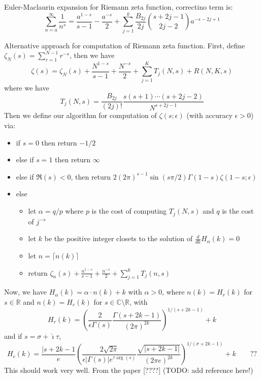 \documentclass[10pt,dvipdfmx,letterpaper,twoside]{article}
\newcommand{\RR}{{\mathbb{R}}}
\newcommand{\CC}{{\mathbb{C}}}
\newcommand{\ii}{{\hat{\imath}}}
\let\al=\alpha
\let\Gam=\Gamma
\begin{document}
Euler-Maclaurin expansion for Riemann zeta function, correctino term is:
\[ \sum_{n=a}^\infty \frac{1}{n^s} = \frac{a^{1-s}}{s-1} - \frac{a^{-s}}{2} + \sum_{j=1}^k \frac{B_{2j}}{2j}\binom{s+2j-1}{2j-2} a^{-s-2j+1} \]

Alternative approach for computation of Riemann zeta function.
First, define $\zeta_N(s) = \sum_{r=1}^{N-1} r^{-s}$, then we have
\[ \zeta(s) = \zeta_N(s) + \frac{N^{1-s}}{s-1} + \frac{N^{-s}}{2} + \sum_{j=1}^K T_j(N,s) + R(N,K,s) \]
where we have
\[ T_j(N,s) = \frac{B_{2j}}{(2j)!} \frac{s(s+1)\cdots(s+2j-2)}{N^{s+2j-1}} \]
Then we define our algorithm for computation of $\zeta(s;\epsilon)$ (with accuracy $\epsilon>0$) via:
\begin{itemize}
  \item if $s=0$ then return $-1/2$
  \item else if $s=1$ then return $\infty$
  \item else if $\Re(s)<0$, then return $2(2\pi)^{s-1} \sin(s\pi/2) \Gamma(1-s) \zeta(1-s;\epsilon)$
  \item else
  \begin{itemize}
    \item let $\al=q/p$ where $p$ is the cost of computing $T_j(N,s)$ and $q$ is the cost of $j^{-s}$
    \item let $k$ be the positive integer closets to the solution of $\frac{d}{dk} H_\al(k)=0$
    \item let $n=\lceil n(k) \rceil$
    \item return $\zeta_n(s) + \frac{n^{1-s}}{s-1} + \frac{n^{-s}}{2} + \sum_{j=1}^k T_j(n,s)$
  \end{itemize}
\end{itemize}
Now, we have $H_\al(k) = \al\cdot n(k) + k$ with $\al>0$, where $n(k)=H_r(k)$ for $s\in\RR$ and $n(k)=H_c(k)$ for $s\in\CC\setminus\RR$,
with
\[ H_r(k) = \left( \frac{2}{\epsilon\Gam(s)} \frac{\Gam(s+2k-1)}{(2\pi)^{2k}} \right)^{1/(s+2k-1)} + k \]
and if $s=\sigma+\ii\tau$,
\[ H_c(k) = \frac{|s+2k-1}{e} \left(\frac{2\sqrt{2\pi}}{\epsilon|\Gam(s)|e^{\tau\arg(s)}} \frac{\sqrt{|s+2k-1|}}{(2\pi e)^{2k}}\right)^{1/(\sigma+2k-1)}  + k
  \qquad\text{??}\]
This should work very well.  From the paper [????] (TODO: add reference here!)
\end{document}
